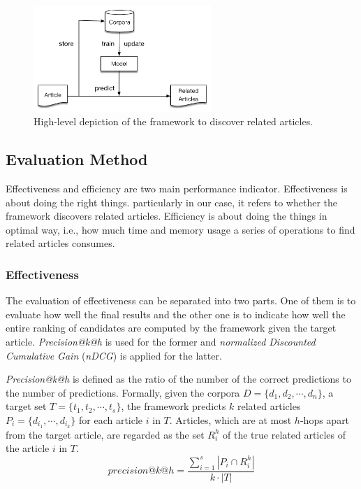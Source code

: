 \begin{figure}[!htb]
    \centering
    \includegraphics[width=0.6\textwidth]{fig/high-level.pdf}
    \caption{High-level depiction of the framework to discover related articles. }
    \label{fig:highlevel}
\end{figure}

\subsection{Evaluation Method}
\label{sec:3.3}

Effectiveness and efficiency are two main performance indicator. Effectiveness is about doing the right things. particularly in our case, it refers to whether the framework discovers related articles. Efficiency is about doing the things in optimal way, i.e., how much time and memory usage a series of operations to find related articles consumes. 

\subsubsection{Effectiveness}

The evaluation of effectiveness can be separated into two parts. One of them is to evaluate how well the final results and the other one is to indicate how well the entire ranking of candidates are computed by the framework given the target article. \textit{Precision@k@h} is used for the former and \textit{normalized Discounted Cumulative Gain} (\textit{nDCG}) is applied for the latter. 

\textit{Precision@k@h} is defined as the ratio of the number of the correct predictions to the number of predictions. Formally, given the corpora $D = \{d_1, d_2, \cdots, d_n\}$, a target set $T = \{t_1, t_2, \cdots, t_s\}$, the framework predicts $k$ related articles $P_i = \{d_{i_1}, \cdots, d_{i_k}\}$ for each article $i$ in $T$. Articles, which are at most $h$-hops apart from the target article, are regarded as the set $R_i^h$ of the true related articles of the article $i$ in $T$. 
\begin{equation}
    precision@k@h = \frac{\sum_{i=1}^s{|P_i \cap R_i^h|}}{k \cdot |T|}
\end{equation}

